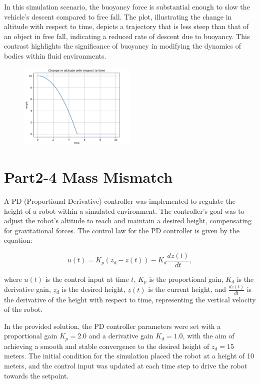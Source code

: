 \documentclass[letterpaper, 10 pt, conference]{ieeeconf}  %
\begin{document}
In this simulation scenario, the buoyancy force is substantial enough to slow the vehicle's descent compared to free fall. The plot, illustrating the change in altitude with respect to time, depicts a trajectory that is less steep than that of an object in free fall, indicating a reduced rate of descent due to buoyancy. This contrast highlights the significance of buoyancy in modifying the dynamics of bodies within fluid environments.


\begin{figure}[htbp]
    \centering
    \includegraphics[width=0.5\textwidth]{image4.png}
\end{figure}

\section{Part2-4 Mass Mismatch}
A PD (Proportional-Derivative) controller was implemented to regulate the height of a robot within a simulated environment. The controller's goal was to adjust the robot's altitude to reach and maintain a desired height, compensating for gravitational forces. The control law for the PD controller is given by the equation:

\[ u(t) = K_p (z_d - z(t)) - K_d \frac{dz(t)}{dt}, \]

where \( u(t) \) is the control input at time \( t \), \( K_p \) is the proportional gain, \( K_d \) is the derivative gain, \( z_d \) is the desired height, \( z(t) \) is the current height, and \( \frac{dz(t)}{dt} \) is the derivative of the height with respect to time, representing the vertical velocity of the robot.

In the provided solution, the PD controller parameters were set with a proportional gain \( K_p = 2.0 \) and a derivative gain \( K_d = 1.0 \), with the aim of achieving a smooth and stable convergence to the desired height of \( z_d = 15 \) meters. The initial condition for the simulation placed the robot at a height of 10 meters, and the control input was updated at each time step to drive the robot towards the setpoint.
\end{document}
